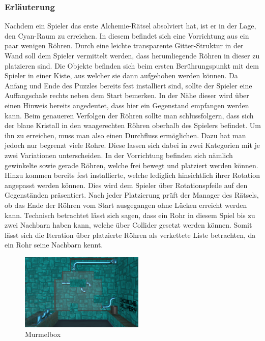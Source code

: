 \subsubsection{Erläuterung}
Nachdem ein Spieler das erste Alchemie-Rätsel absolviert hat, ist er in der Lage, den Cyan-Raum zu erreichen. In diesem befindet sich eine Vorrichtung aus ein paar wenigen Röhren. Durch eine leichte transparente Gitter-Struktur in der Wand soll dem Spieler vermittelt werden, dass herumliegende Röhren in dieser zu platzieren sind. Die Objekte befinden sich beim ersten Berührungspunkt mit dem Spieler in einer Kiste, aus welcher sie dann aufgehoben werden können. Da Anfang und Ende des Puzzles bereits fest installiert sind, sollte der Spieler eine Auffangschale rechts neben dem Start bemerken. In der Nähe dieser wird über einen Hinweis bereits angedeutet, dass hier ein Gegenstand empfangen werden kann. Beim genaueren Verfolgen der Röhren sollte man schlussfolgern, dass sich der blaue Kristall in den waagerechten Röhren oberhalb des Spielers befindet. Um ihn zu erreichen, muss man also einen Durchfluss ermöglichen. Dazu hat man jedoch nur begrenzt viele Rohre. Diese lassen sich dabei in zwei Kategorien mit je zwei Variationen unterscheiden. In der Vorrichtung befinden sich nämlich gewinkelte sowie gerade Röhren, welche frei bewegt und platziert werden können. Hinzu kommen bereits fest installierte, welche lediglich hinsichtlich ihrer Rotation angepasst werden können. Dies wird dem Spieler über Rotationspfeile auf den Gegenständen präsentiert. Nach jeder Platzierung prüft der Manager des Rätsels, ob das Ende der Röhren vom Start ausgegangen ohne Lücken erreicht werden kann. Technisch betrachtet lässt sich sagen, dass ein Rohr in diesem Spiel bis zu zwei Nachbarn haben kann, welche über Collider gesetzt werden können. Somit lässt sich die Iteration über platzierte Röhren als verkettete Liste betrachten, da ein Rohr seine Nachbarn kennt.\\
\begin{figure}
	\includegraphics[width=5.9cm]{Pictures/Roehren}
	\caption{Murmelbox}
	\vspace*{-1cm}
	\label{fig:cyan}
\end{figure}
